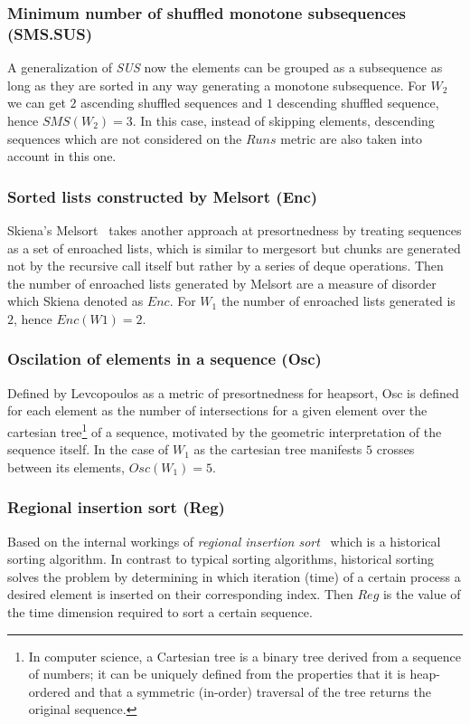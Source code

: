 \subsubsection{Minimum number of shuffled monotone subsequences (SMS.SUS)}
A generalization of \textit{SUS} now the elements can be grouped as a subsequence as long as they are sorted in any way generating a monotone subsequence. For $W_2$ we can get $2$ ascending shuffled sequences\cite{Carlsson_Levcopoulos_Petersson_1993} and $1$ descending shuffled sequence, hence $SMS(W_2) = 3$. In this case, instead of skipping elements, descending sequences which are not considered on the $Runs$ metric are also taken into account in this one.


\subsubsection{Sorted lists constructed by Melsort (Enc)}
Skiena's Melsort~\cite{Skiena_1988} takes another approach at presortnedness by treating sequences as a set of enroached lists, which is similar to mergesort but chunks are generated not by the recursive call itself but rather by a series of deque operations\cite{Baeza-Yates_Manber_1992}. Then the number of enroached lists generated by Melsort are a measure of disorder which Skiena denoted as $Enc$. For $W_1$ the number of enroached lists generated is $2$, hence $Enc(W1)=2$.

\subsubsection{Oscilation of elements in a sequence (Osc)}
Defined by Levcopoulos as a metric of presortnedness for heapsort, Osc is defined for each element as the number of intersections for a given element over the cartesian tree\footnote{In computer science, a Cartesian tree is a binary tree derived from a sequence of numbers; it can be uniquely defined from the properties that it is heap-ordered and that a symmetric (in-order) traversal of the tree returns the original sequence.} of a sequence\cite{Levcopoulos_Petersson_1993}, motivated by the geometric interpretation of the sequence itself. In the case of $W_1$ as the cartesian tree manifests $5$ crosses between its  elements, $Osc(W_1) = 5$.

\subsubsection{Regional insertion sort (Reg)}
Based on the internal workings of \textit{regional insertion sort}~\cite{Cantoni_Creutzburg_Levialdi_Wolf_1989} which is a historical sorting algorithm. In contrast to typical sorting algorithms, historical sorting solves the problem by determining in which iteration (time) of a certain process a desired element is inserted on their corresponding index. Then $Reg$ is the value of the time dimension required to sort a certain sequence. %

